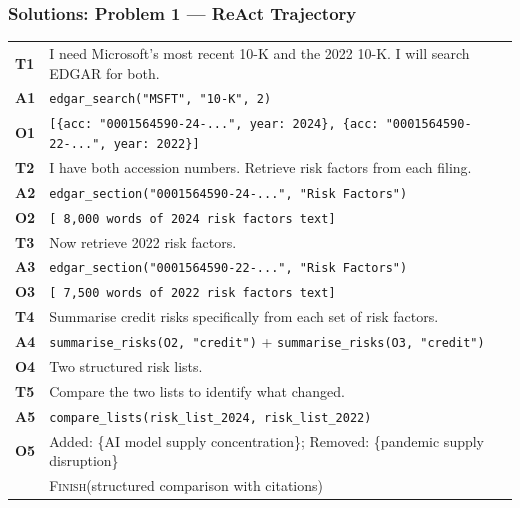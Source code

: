 \documentclass[9pt,t]{beamer}
\begin{document}
\begin{frame}
\frametitle{Solutions: Problem 1 --- ReAct Trajectory}

\scriptsize
\begin{tabular}{p{}p{}}
\textbf{T1} & I need Microsoft's most recent 10-K and the 2022 10-K. I will search EDGAR for both. \\[3pt]
\textbf{A1} & \texttt{edgar\_search("MSFT", "10-K", 2)} \\[3pt]
\textbf{O1} & \texttt{[\{acc: "0001564590-24-...", year: 2024\}, \{acc: "0001564590-22-...", year: 2022\}]} \\[6pt]
\textbf{T2} & I have both accession numbers. Retrieve risk factors from each filing. \\[3pt]
\textbf{A2} & \texttt{edgar\_section("0001564590-24-...", "Risk Factors")} \\[3pt]
\textbf{O2} & \texttt{[~8,000 words of 2024 risk factors text]} \\[6pt]
\textbf{T3} & Now retrieve 2022 risk factors. \\[3pt]
\textbf{A3} & \texttt{edgar\_section("0001564590-22-...", "Risk Factors")} \\[3pt]
\textbf{O3} & \texttt{[~7,500 words of 2022 risk factors text]} \\[6pt]
\textbf{T4} & Summarise credit risks specifically from each set of risk factors. \\[3pt]
\textbf{A4} & \texttt{summarise\_risks(O2, "credit")} + \texttt{summarise\_risks(O3, "credit")} \\[3pt]
\textbf{O4} & Two structured risk lists. \\[6pt]
\textbf{T5} & Compare the two lists to identify what changed. \\[3pt]
\textbf{A5} & \texttt{compare\_lists(risk\_list\_2024, risk\_list\_2022)} \\[3pt]
\textbf{O5} & Added: \{AI model supply concentration\}; Removed: \{pandemic supply disruption\} \\[6pt]
\textbf{} & \textsc{Finish}(structured comparison with citations) \\
\end{tabular}
\normalsize
\end{frame}
\end{document}

